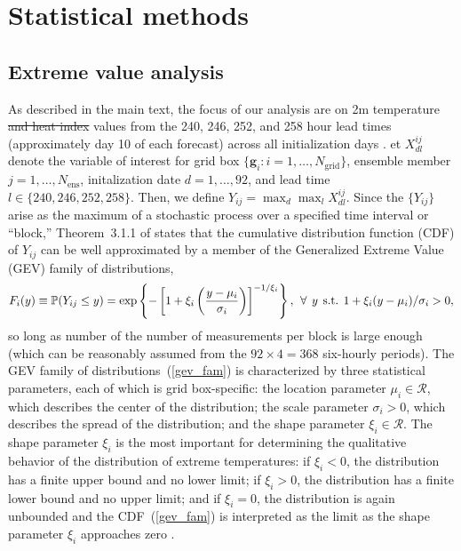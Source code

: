 \documentclass{article}
\newcommand{\bg}{\boldsymbol{g}}
\begin{document}
\section{Statistical methods} \label{appdx:statmethods}


\subsection{Extreme value analysis} \label{sec_eva}

As described in the main text, %
the focus of our analysis are on 2m temperature \st{and heat index} values from the 240, 246, 252, and 258 hour lead times (approximately day 10 of each forecast) across all initialization days . et $X^{ij}_{dl}$ denote the variable of interest for grid box $\{\bg_i: i=1,\dots,N_\text{grid}\}$, ensemble member $j=1, \dots, N_\text{ens}$, initalization date $d = 1, \dots, 92$, and lead time $l \in \{240, 246, 252, 258\}$. Then, we define $Y_{ij} = \max_{d} \max_{l} X^{ij}_{dl}$. %
Since the $\{Y_{ij}\}$ arise as the maximum of a stochastic process over a specified time interval or ``block,'' Theorem~3.1.1 of \cite{Coles2001} states that the cumulative distribution function (CDF) of $Y_{ij}$ can be well approximated by a member of the Generalized Extreme Value (GEV) family of distributions,
\begin{equation} \label{gev_fam}
F_i(y) \equiv \mathbb{P}(Y_{ij} \leq y) = \exp\left\{-\left[ 1 + \xi_i\left(\frac{y - \mu_i}{\sigma_i}\right) \right]^{-1/\xi_i} \right\}, \hskip1ex \forall \hskip1ex y \hskip1ex \text{s.t.} \hskip1ex 1 + \xi_i(y - \mu_i)/\sigma_i > 0,
\end{equation}
so long as number of the number of measurements per block is large enough (which can be reasonably assumed from the $92\times4=368$ six-hourly periods). The GEV family of distributions~(\ref{gev_fam}) is characterized by three statistical parameters, each of which is grid box-specific: the location parameter $\mu_i \in \mathcal{R}${, }which describes the center of the distribution{;} the scale parameter $\sigma_i>0$, which describes the spread of the distribution{;} and the shape parameter $\xi_i \in \mathcal{R}$. The shape parameter $\xi_i$ is the most important {for} determining the qualitative behavior of the distribution of extreme temperatures: if $\xi_i<0$, the distribution has a finite upper bound and no lower limit; if $\xi_i >0$, the distribution has a finite lower bound and no upper limit; {and} if $\xi_i = 0$, the distribution is again unbounded and the CDF~(\ref{gev_fam}) is interpreted as the limit as the shape parameter $\xi_i$ approaches zero \citep{Coles2001}.
\end{document}
